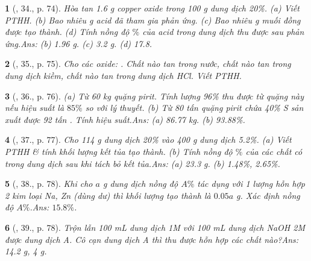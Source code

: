 \documentclass{article}
\newtheorem{baitoan}{}
\begin{document}
\begin{baitoan}[\cite{An_Hoa_Hoc_nang_cao_8_9}, 34., p. 74]
	Hòa tan {\rm1.6 g} copper oxide trong {\rm100 g} dung dịch {\rm{} 20\%}. (a) Viết {\rm PTHH}. (b) Bao nhiêu {\rm g} acid đã tham gia phản ứng. (c) Bao nhiêu {\rm g} muối đồng được tạo thành. (d) Tính nồng độ $\%$ của acid trong dung dịch thu được sau phản ứng.\hfill{\sf Ans: (b) 1.96 g. (c) 3.2 g. (d) 17.8.}
\end{baitoan}

\begin{baitoan}[\cite{An_Hoa_Hoc_nang_cao_8_9}, 35., p. 75]
	Cho các oxide: {\rm{}}. Chất nào tan trong nước, chất nào tan trong dung dịch kiềm, chất nào tan trong dung dịch {\rm HCl}. Viết {\rm PTHH}.
\end{baitoan}

\begin{baitoan}[\cite{An_Hoa_Hoc_nang_cao_8_9}, 36., p. 76]
	(a) Từ {\rm60 kg} quặng pirit. Tính lượng {\rm{} 96\%} thu được từ quặng này nếu hiệu suất là $85\%$ so với lý thuyết. (b) Từ {\rm80} tấn quặng pirit chứa {\rm40\% S} sản xuất được {\rm92} tấn {\rm{}}. Tính hiệu suất.\hfill{\sf Ans: (a) 86.77 kg. (b) 93.88\%.}
\end{baitoan}

\begin{baitoan}[\cite{An_Hoa_Hoc_nang_cao_8_9}, 37., p. 77]
	Cho {\rm114 g} dung dịch {\rm{} 20\%} vào {\rm400 g} dung dịch {\rm{} 5.2\%}. (a) Viết {\rm PTHH} \& tính khối lượng kết tủa tạo thành. (b) Tính nồng độ $\%$ của các chất có trong dung dịch sau khi tách bỏ kết tủa.\hfill{\sf Ans: (a) 23.3 g. (b) 1.48\%, 2.65\%.}
\end{baitoan}

\begin{baitoan}[\cite{An_Hoa_Hoc_nang_cao_8_9}, 38., p. 78]
	Khi cho $a$ {\rm g} dung dịch {\rm {}} nồng độ $A\%$ tác dụng với 1 lượng hỗn hợp 2 kim loại {\rm Na, Zn} (dùng dư) thì khối lượng {\rm {}} tạo thành là $0.05a$ {\rm g}. Xác định nồng độ $A\%$.\hfill{\sf Ans: $15.8\%$.}
\end{baitoan}

\begin{baitoan}[\cite{An_Hoa_Hoc_nang_cao_8_9}, 39., p. 78]
	Trộn lẫn {\rm100 mL} dung dịch {\rm{} 1M} với {\rm100 mL} dung dịch {\rm NaOH 2M} được dung dịch A. Cô cạn dung dịch A thì thu được hỗn hợp các chất nào?\hfill{\sf Ans: 14.2 g, 4 g.}
\end{baitoan}
\end{document}
